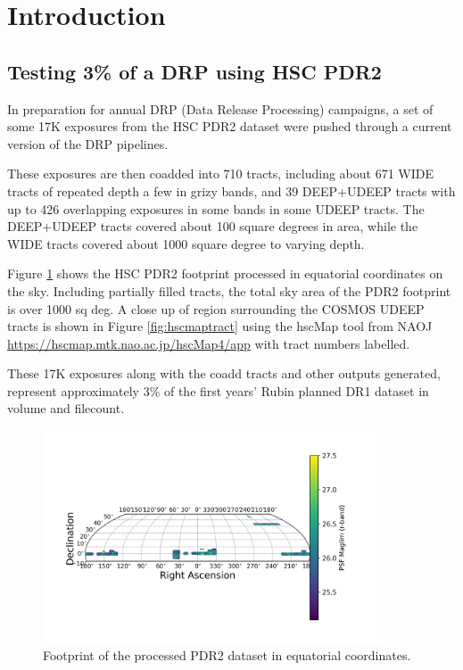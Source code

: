 \section{Introduction}\label{sec:intro}

\subsection{Testing 3\% of a DRP using HSC PDR2}

In preparation for annual DRP (Data Release Processing) campaigns, 
a set of some 17K exposures from the HSC PDR2 dataset were pushed through
a current version of the DRP pipelines.

These exposures are then coadded into 710 tracts, including about 671
WIDE tracts of repeated depth a few in grizy bands, and 39 DEEP+UDEEP 
tracts with up to 426 overlapping exposures in some bands in some UDEEP tracts.
The DEEP+UDEEP tracts covered about 100 square degrees in area, while the
WIDE tracts covered about 1000 square degree to varying depth.

Figure \ref{fig:footprint1} shows the HSC PDR2 footprint processed in equatorial coordinates
on the sky.  Including partially filled tracts, the total sky area of the PDR2
footprint is over 1000 sq deg.    A close up of region surrounding the COSMOS UDEEP tracts is shown in Figure \ref{fig:hscmaptract} using the hscMap tool from NAOJ \url{https://hscmap.mtk.nao.ac.jp/hscMap4/app} with tract numbers labelled.

These 17K exposures along with the coadd tracts and other
outputs generated, represent approximately 3\% of the first 
years' Rubin planned DR1 dataset in volume and filecount.

\begin{figure}[hbt!]
\includegraphics[width=0.9\textwidth]{r_maglim_pdr2.png}
	 \caption{Footprint of the processed PDR2 dataset in equatorial coordinates.  \label{fig:footprint1}}
\end{figure}

